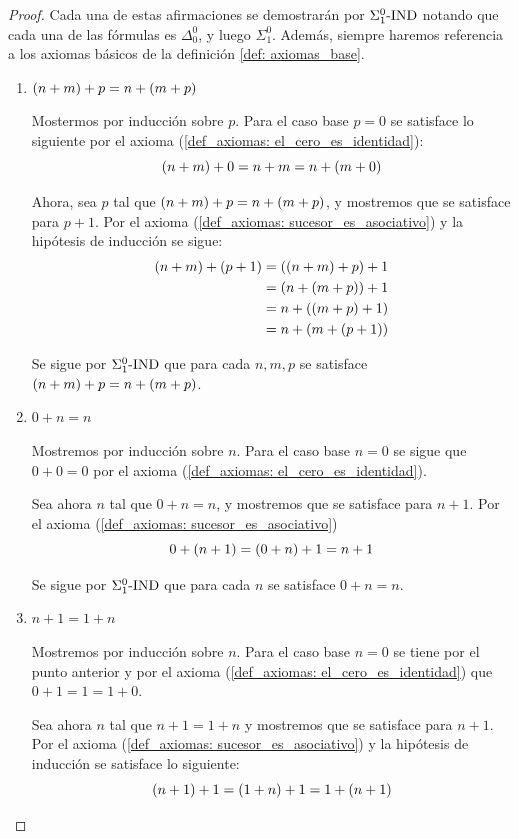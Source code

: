 \begin{proof}
	Cada una de estas afirmaciones se demostrarán por $\INDUCCION{\Sigma_{1}^{0}}$ notando que cada una de las fórmulas es $\Delta_{0}^{0}$, y luego $\Sigma_{1}^{0}$. Además, siempre haremos referencia a los axiomas básicos de la definición \ref{def: axiomas_base}.
	\begin{enumerate}
		\item $\pa*{n + m} + p = n +\pa*{m + p}$
		
		Mostermos por inducción sobre $p$. Para el caso base $p = 0$ se satisface lo siguiente por el axioma (\ref{def_axiomas: el_cero_es_identidad}):
		\[
			\pa*{n + m} + 0 = n + m = n +\pa*{m + 0}
		\]

		Ahora, sea $p$ tal que $\pa*{n + m} + p = n +\pa*{m + p}$, y mostremos que se satisface para $p + 1$. Por el axioma (\ref{def_axiomas: sucesor_es_asociativo}) y la hipótesis de inducción se sigue:
		\begin{align*}
			\pa*{n + m} + \pa*{p + 1} &= \pa*{\pa*{n + m} + p} + 1 \\
			&= \pa*{n +\pa*{m + p}} + 1 \\
			&= n +\pa*{\pa*{m + p} + 1}\\
			&= n +\pa*{m +\pa*{p + 1}}
		\end{align*}

		Se sigue por $\INDUCCION{\Sigma_{1}^{0}}$ que para cada $n, m, p$ se satisface $\pa*{n + m} + p = n +\pa*{m + p}$.

		\item $0 + n = n$
		
		Mostremos por inducción sobre $n$. Para el caso base $n = 0$ se sigue que $0 + 0 = 0$ por el axioma (\ref{def_axiomas: el_cero_es_identidad}).

		Sea ahora $n$ tal que $0 + n = n$, y mostremos que se satisface para $n + 1$. Por el axioma (\ref{def_axiomas: sucesor_es_asociativo})
		\[
			0 +\pa*{n + 1} =\pa*{0 + n} + 1 = n + 1
		\]

		Se sigue por $\INDUCCION{\Sigma_{1}^{0}}$ que para cada $n$ se satisface $0 + n = n$.

		\item $n + 1 = 1 + n$
		
		Mostremos por inducción sobre $n$. Para el caso base $n = 0$ se tiene por el punto anterior y por el axioma (\ref{def_axiomas: el_cero_es_identidad}) que $0 + 1 = 1 = 1 + 0$.

		Sea ahora $n$ tal que $n + 1 = 1 + n$ y mostremos que se satisface para $n + 1$. Por el axioma (\ref{def_axiomas: sucesor_es_asociativo}) y la hipótesis de inducción se satisface lo siguiente:
		\[
			\pa*{n + 1} + 1 = \pa*{1 + n} + 1 = 1 + \pa*{n + 1}
		\]


\end{enumerate}
\end{proof}
